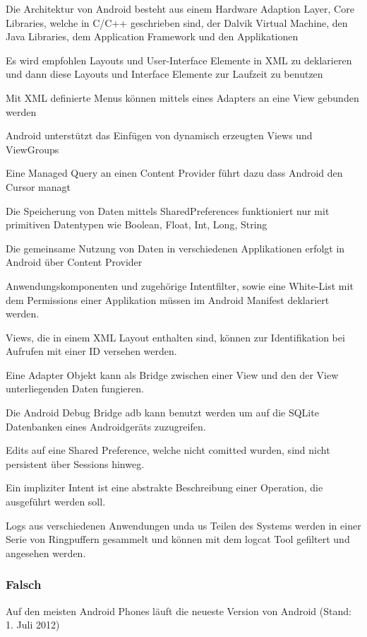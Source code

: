 Die Architektur von Android besteht aus einem Hardware
Adaption Layer, Core Libraries, welche in C/C++ geschrieben
sind, der Dalvik Virtual Machine, den Java Libraries, dem
Application Framework und den Applikationen

Es wird empfohlen Layouts und User-Interface Elemente in XML
zu deklarieren und dann diese Layouts und Interface Elemente
zur Laufzeit zu benutzen

Mit XML definierte Menus können mittels eines Adapters an eine
View gebunden werden

Android unterstützt das Einfügen von dynamisch erzeugten Views
und ViewGroups

Eine Managed Query an einen Content Provider führt dazu dass
Android den Cursor managt

Die Speicherung von Daten mittels SharedPreferences
funktioniert nur mit primitiven Datentypen wie Boolean, Float, Int,
Long, String

Die gemeinsame Nutzung von Daten in verschiedenen
Applikationen erfolgt in Android über Content Provider

Anwendungskomponenten und zugehörige Intentfilter, sowie eine White-List mit
dem Permissions einer Applikation müssen im Android Manifest deklariert werden.

Views, die in einem XML Layout enthalten sind, können zur Identifikation bei
Aufrufen mit einer ID versehen werden.

Eine Adapter Objekt kann als Bridge zwischen einer View und den der View
unterliegenden Daten fungieren.

Die Android Debug Bridge adb kann benutzt werden um auf die SQLite Datenbanken
eines Androidgeräts zuzugreifen.

Edits auf eine Shared Preference, welche nicht comitted wurden, sind nicht
persistent über Sessions hinweg.

Ein impliziter Intent ist eine abstrakte Beschreibung einer Operation, die
ausgeführt werden soll.

Logs aus verschiedenen Anwendungen unda us Teilen des Systems werden in einer
Serie von Ringpuffern gesammelt und können mit dem logcat Tool gefiltert und
angesehen werden.

\subsubsection{Falsch}
Auf den meisten Android Phones läuft die neueste Version von Android (Stand: 1.
Juli 2012)

